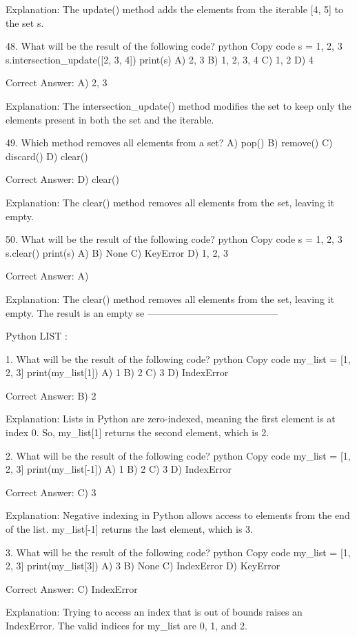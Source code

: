 Explanation:
The update() method adds the elements from the iterable [4, 5] to the set s.

48. What will be the result of the following code?
python
Copy code
s = {1, 2, 3}
s.intersection_update([2, 3, 4])
print(s)
A) {2, 3}
B) {1, 2, 3, 4}
C) {1, 2}
D) {4}

Correct Answer: A) {2, 3}

Explanation:
The intersection_update() method modifies the set to keep only the elements present in both the set and the iterable.

49. Which method removes all elements from a set?
A) pop()
B) remove()
C) discard()
D) clear()

Correct Answer: D) clear()

Explanation:
The clear() method removes all elements from the set, leaving it empty.

50. What will be the result of the following code?
python
Copy code
s = {1, 2, 3}
s.clear()
print(s)
A) {}
B) None
C) KeyError
D) {1, 2, 3}

Correct Answer: A) {}

Explanation:
The clear() method removes all elements from the set, leaving it empty. The result is an empty se
-----------------------------------------

Python LIST :

1. What will be the result of the following code?
python
Copy code
my_list = [1, 2, 3]
print(my_list[1])
A) 1
B) 2
C) 3
D) IndexError

Correct Answer: B) 2

Explanation:
Lists in Python are zero-indexed, meaning the first element is at index 0. So, my_list[1] returns the second element, which is 2.

2. What will be the result of the following code?
python
Copy code
my_list = [1, 2, 3]
print(my_list[-1])
A) 1
B) 2
C) 3
D) IndexError

Correct Answer: C) 3

Explanation:
Negative indexing in Python allows access to elements from the end of the list. my_list[-1] returns the last element, which is 3.

3. What will be the result of the following code?
python
Copy code
my_list = [1, 2, 3]
print(my_list[3])
A) 3
B) None
C) IndexError
D) KeyError

Correct Answer: C) IndexError

Explanation:
Trying to access an index that is out of bounds raises an IndexError. The valid indices for my_list are 0, 1, and 2.

